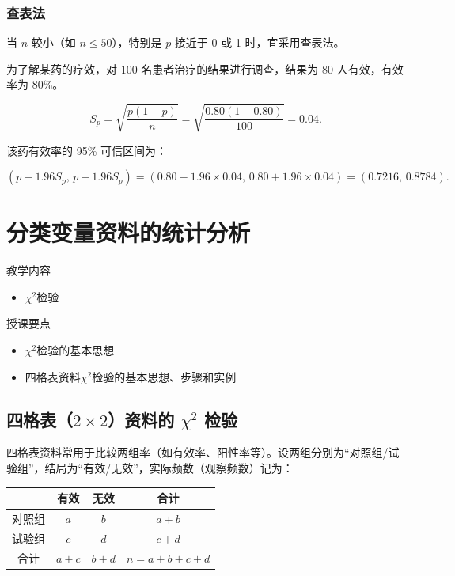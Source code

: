 \documentclass[lang=cn,10pt]{elegantbook}
\begin{document}
\subsection{查表法}

当 $n$ 较小（如 $n\le 50$），特别是 $p$ 接近于 0 或 1 时，宜采用查表法。

\vspace{0.2cm}
\begin{exercise}
为了解某药的疗效，对 100 名患者治疗的结果进行调查，结果为 80 人有效，有效率为 80\%。
\end{exercise}

\begin{solution}
\[
  S_p=\sqrt{\frac{p(1-p)}{n}}=\sqrt{\frac{0.80(1-0.80)}{100}}=0.04.
\]

该药有效率的 95\% 可信区间为：

\[
  \left(p-1.96S_p,\,p+1.96S_p\right)=\left(0.80-1.96\times 0.04,\,0.80+1.96\times 0.04\right)=(0.7216,\,0.8784).
\]

\end{solution}

\chapter{分类变量资料的统计分析}

\begin{introduction}
    \item 教学内容
    \begin{itemize}
        \item $\chi^2$检验


    \end{itemize}
    \item 授课要点
    \begin{itemize}
        \item $\chi^2$检验的基本思想
        \item 四格表资料$\chi^2$检验的基本思想、步骤和实例

    \end{itemize}
\end{introduction}
\section{四格表（$2\times 2$）资料的 $\chi^2$ 检验}

四格表资料常用于比较两组率（如有效率、阳性率等）。设两组分别为“对照组/试验组”，结局为“有效/无效”，实际频数（观察频数）记为：
\begin{center}
\begin{tabular}{cccc}
  \hline
  & 有效 & 无效 & 合计\\
  \hline
  对照组 & $a$ & $b$ & $a+b$\\
  试验组 & $c$ & $d$ & $c+d$\\
  合计 & $a+c$ & $b+d$ & $n=a+b+c+d$\\
  \hline
\end{tabular}
\end{center}
\end{document}
